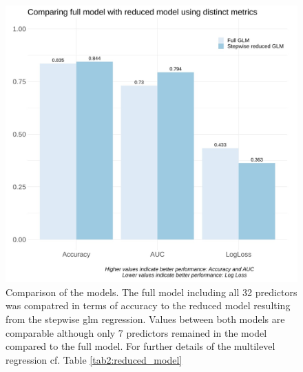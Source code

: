 \documentclass{bmcart}
\begin{document}
\begin{backmatter}
\begin{figure}[h!]
\includegraphics[width=.84\textwidth]{fig4.model.comparison.v1.0.jpg}
\caption{Comparison of the models. The full model including all 32 predictors was compatred in terms of accuracy to the reduced model resulting from the stepwise \ac{glm} regression. Values between both models are comparable although only 7 predictors remained in the model compared to the full model. For further details of the multilevel regression cf. Table \ref{tab2:reduced_model}}
\label{fig4:comparison_models}
\end{figure}


\newpage

\end{backmatter}
\end{document}
